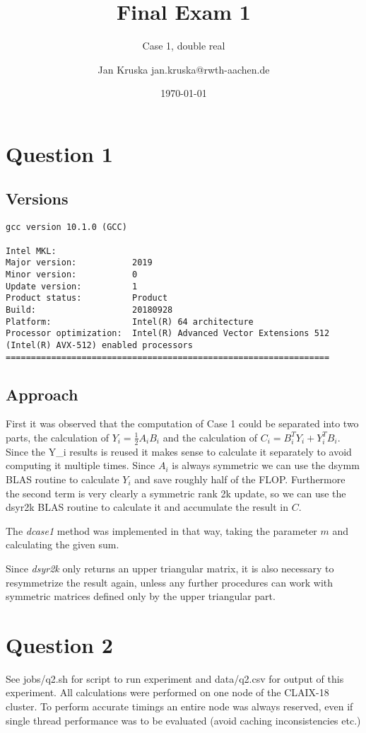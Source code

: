 \documentclass{scrartcl}
\title{Final Exam 1}
\subtitle{Case 1, double real}
\author{Jan Kruska jan.kruska@rwth-aachen.de}
\date{\today}
\begin{document}
\maketitle


\section{Question 1}
\subsection{Versions}
\begin{verbatim}
gcc version 10.1.0 (GCC)

Intel MKL:
Major version:           2019
Minor version:           0
Update version:          1
Product status:          Product
Build:                   20180928
Platform:                Intel(R) 64 architecture
Processor optimization:  Intel(R) Advanced Vector Extensions 512 (Intel(R) AVX-512) enabled processors
================================================================
\end{verbatim}

\subsection{Approach}

First it was observed that the computation of Case 1 could be separated into two parts, the calculation of $Y_i = \frac{1}{2}A_iB_i$ and the calculation of $C_i = B_i^TY_i + Y_i^TB_i$.
Since the Y_i results is reused it makes sense to calculate it separately to avoid computing it multiple times.
Since $A_i$ is always symmetric we can use the dsymm BLAS routine to calculate $Y_i$ and save roughly half of the FLOP.
Furthermore the second term is very clearly a symmetric rank 2k update, so we can use the dsyr2k BLAS routine to calculate it and accumulate the result in $C$.

The \emph{dcase1} method was implemented in that way, taking the parameter $m$ and calculating the given sum.

Since \emph{dsyr2k} only returns an upper triangular matrix, it is also necessary to resymmetrize the result again, unless any further procedures can work with symmetric matrices defined only by the upper triangular part.

\section{Question 2}
See jobs/q2.sh for script to run experiment and data/q2.csv for output of this experiment.
All calculations were performed on one node of the CLAIX-18 cluster.
To perform accurate timings an entire node was always reserved, even if single thread performance was to be evaluated (avoid caching inconsistencies etc.)
\end{document}
